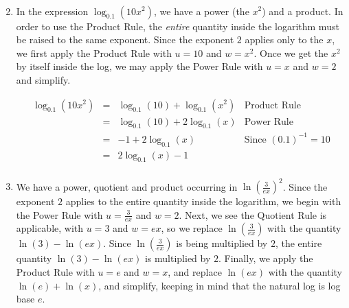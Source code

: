 \begin{ex}
\begin{enumerate}
\[\begin{array}{rclr}
\end{array}\]

\setlength{\extrarowheight}{2pt}

\item   In the expression $\log_{0.1} \left(10 x^2 \right)$, we have a power (the $x^2$) and a product.  In order to use the Product Rule, the \textit{entire} quantity inside the logarithm must be raised to the same exponent.  Since the exponent $2$ applies only to the $x$, we first apply the Product Rule with $u=10$ and $w=x^2$.  Once we get the $x^2$ by itself inside the log, we may apply the Power Rule with $u=x$ and $w=2$ and simplify. 

\setlength{\extrarowheight}{6pt}
\[ \begin{array}{rclr}
\log_{0.1} \left(10 x^2 \right) & = &  \log_{0.1} (10) +  \log_{0.1} \left(x^2 \right) & \mbox{Product Rule} \\
                                & = &  \log_{0.1} (10)+ 2 \log_{0.1} (x) & \mbox{Power Rule} \\
                                & = &  -1 + 2 \log_{0.1} (x) & \mbox{Since $(0.1)^{-1} = 10$} \\
                                & = &  2 \log_{0.1} (x) - 1 & \\
                              
\end{array}\]
\setlength{\extrarowheight}{2pt}


\item  We have a power, quotient and product occurring in $\ln \left(\frac{3}{ex}\right)^2$.  Since the exponent $2$ applies to the entire quantity inside the logarithm, we begin with the Power Rule with $u=\frac{3}{ex}$ and $w = 2$.  Next, we see the Quotient Rule is applicable, with $u=3$ and $w=ex$, so we replace $\ln\left(\frac{3}{ex}\right)$  with the quantity $\ln(3) - \ln(ex)$. Since $\ln \left(\frac{3}{ex}\right)$ is being multiplied by $2$, the entire quantity $\ln(3) - \ln(ex)$ is multiplied by $2$.  Finally, we apply the Product Rule with $u=e$ and $w=x$, and replace $\ln(ex)$ with the quantity $\ln(e) + \ln(x)$, and simplify, keeping in mind that the natural log is log base $e$.

\setlength{\extrarowheight}{6pt}
\[ \begin{array}{rclr}


\end{array}\]
\end{enumerate}
\end{ex}
